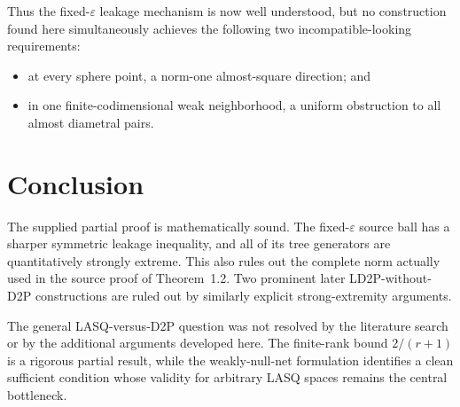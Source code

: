 \documentclass[11pt]{article}
\newcommand{\eps}{\varepsilon}
\begin{document}
Thus the fixed-$\eps$ leakage mechanism is now well understood, but no construction found here simultaneously achieves the following two incompatible-looking requirements:
\begin{itemize}
\item at every sphere point, a norm-one almost-square direction; and
\item in one finite-codimensional weak neighborhood, a uniform obstruction to all almost diametral pairs.
\end{itemize}

\section{Conclusion}

The supplied partial proof is mathematically sound.  The fixed-$\eps$ source ball has a sharper symmetric leakage inequality, and all of its tree generators are quantitatively strongly extreme.  This also rules out the complete norm actually used in the source proof of Theorem~1.2.  Two prominent later LD2P-without-D2P constructions are ruled out by similarly explicit strong-extremity arguments.

The general LASQ-versus-D2P question was not resolved by the literature search or by the additional arguments developed here.  The finite-rank bound $2/(r+1)$ is a rigorous partial result, while the weakly-null-net formulation identifies a clean sufficient condition whose validity for arbitrary LASQ spaces remains the central bottleneck.
\end{document}
